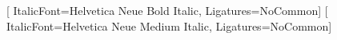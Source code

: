 \documentclass[letterpaper,11pt]{article}
\newcommand{\reslink}[2]{\href{#1}{#2}}
\begin{document}
\resumemain
\newfontfamily{}[
  ItalicFont={Helvetica Neue Bold Italic}, Ligatures=NoCommon]
\renewcommand{\textbf}[1]{{\resumebold #1}}
\newfontfamily{}[
  ItalicFont={Helvetica Neue Medium Italic}, Ligatures=NoCommon]

\newcommand{\skilltag}[1]{\mbox{#1}\hspace{2.5pt}}


\end{document}

